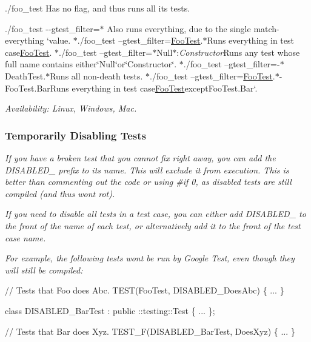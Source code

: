 {\itshape 
\begin{DoxyItemize}
\item {\ttfamily ./foo\+\_\+test} Has no flag, and thus runs all its tests.
\item {\ttfamily ./foo\+\_\+test -\/-\/gtest\+\_\+filter=$\ast$} Also runs everything, due to the single match-\/everything `{\ttfamily value. $\ast$}./foo\+\_\+test --gtest\+\_\+filter=\hyperlink{classFooTest}{Foo\+Test}.$\ast${\ttfamily Runs everything in test case}\hyperlink{classFooTest}{Foo\+Test}{\ttfamily . $\ast$}./foo\+\_\+test --gtest\+\_\+filter=$\ast$\+Null$\ast$\+:{\itshape Constructor}{\ttfamily Runs any test whose full name contains either}\char`\"{}\+Null\char`\"{}{\ttfamily or}\char`\"{}\+Constructor\char`\"{}{\ttfamily . $\ast$}./foo\+\_\+test --gtest\+\_\+filter=-\/$\ast$\+Death\+Test.$\ast${\ttfamily Runs all non-\/death tests. $\ast$}./foo\+\_\+test --gtest\+\_\+filter=\hyperlink{classFooTest}{Foo\+Test}.$\ast$-\/\+Foo\+Test.Bar{\ttfamily Runs everything in test case}\hyperlink{classFooTest}{Foo\+Test}{\ttfamily except}Foo\+Test.\+Bar`.
\end{DoxyItemize}}

{\itshape {\itshape Availability\+:} Linux, Windows, Mac.}

{\itshape \subsubsection*{Temporarily Disabling Tests}}

{\itshape }

{\itshape If you have a broken test that you cannot fix right away, you can add the {\ttfamily D\+I\+S\+A\+B\+L\+E\+D\+\_\+} prefix to its name. This will exclude it from execution. This is better than commenting out the code or using {\ttfamily \#if 0}, as disabled tests are still compiled (and thus won\textquotesingle{}t rot).}

{\itshape If you need to disable all tests in a test case, you can either add {\ttfamily D\+I\+S\+A\+B\+L\+E\+D\+\_\+} to the front of the name of each test, or alternatively add it to the front of the test case name.}

{\itshape For example, the following tests won\textquotesingle{}t be run by Google Test, even though they will still be compiled\+:}

{\itshape 
\begin{DoxyCode}
// Tests that Foo does Abc.
TEST(FooTest, DISABLED\_DoesAbc) \{ ... \}

class DISABLED\_BarTest : public ::testing::Test \{ ... \};

// Tests that Bar does Xyz.
TEST\_F(DISABLED\_BarTest, DoesXyz) \{ ... \}
\end{DoxyCode}
}

